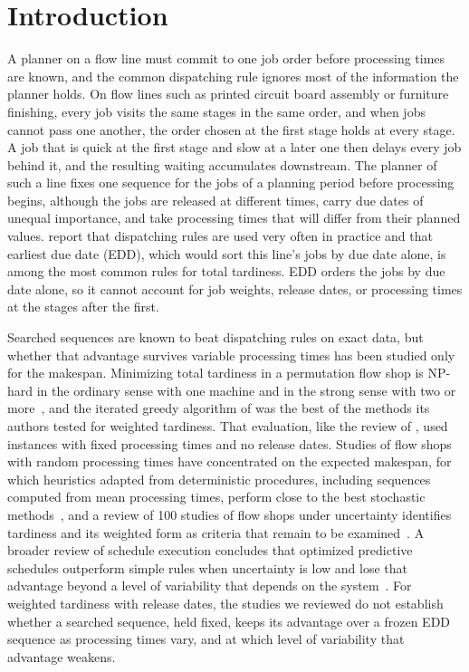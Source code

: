 \section{Introduction}\label{sec:introduction}

\sumpara A planner on a flow line must commit to one job order before processing times are known, and the common dispatching rule ignores most of the information the planner holds. \sumparaend
\fin On flow lines such as printed circuit board assembly or furniture finishing, every job visits the same stages in the same order, and when jobs cannot pass one another, the order chosen at the first stage holds at every stage. \fine
\fin A job that is quick at the first stage and slow at a later one then delays every job behind it, and the resulting waiting accumulates downstream. \fine
\fin The planner of such a line fixes one sequence for the jobs of a planning period before processing begins, although the jobs are released at different times, carry due dates of unequal importance, and take processing times that will differ from their planned values. \fine
\fin \citet{vallada2008review} report that dispatching rules are used very often in practice and that earliest due date (EDD), which would sort this line's jobs by due date alone, is among the most common rules for total tardiness. \fine
\fin EDD orders the jobs by due date alone, so it cannot account for job weights, release dates, or processing times at the stages after the first. \fine

\sumpara Searched sequences are known to beat dispatching rules on exact data, but whether that advantage survives variable processing times has been studied only for the makespan. \sumparaend
\fin Minimizing total tardiness in a permutation flow shop is NP-hard in the ordinary sense with one machine and in the strong sense with two or more~\cite{vallada2008review}, and the iterated greedy algorithm of \citet{ruiz2008igwt} was the best of the methods its authors tested for weighted tardiness. \fine
\fin That evaluation, like the review of \citet{vallada2008review}, used instances with fixed processing times and no release dates. \fine
\fin Studies of flow shops with random processing times have concentrated on the expected makespan, for which heuristics adapted from deterministic procedures, including sequences computed from mean processing times, perform close to the best stochastic methods~\cite{baker2012stochastic,framinan2015stochastic,juan2014simheuristic}, and a review of 100 studies of flow shops under uncertainty identifies tardiness and its weighted form as criteria that remain to be examined~\cite{gonzalezneira2017review}. \fine
\fin A broader review of schedule execution concludes that optimized predictive schedules outperform simple rules when uncertainty is low and lose that advantage beyond a level of variability that depends on the system~\cite{aytug2005executing}. \fine
\fin For weighted tardiness with release dates, the studies we reviewed do not establish whether a searched sequence, held fixed, keeps its advantage over a frozen EDD sequence as processing times vary, and at which level of variability that advantage weakens. \fine

